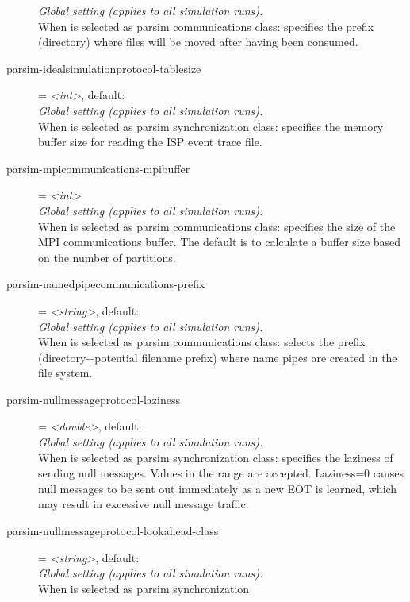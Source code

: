 \begin{description}
    \textit{Global setting (applies to all simulation runs).}\\
    When  is selected as parsim communications
    class: specifies the prefix (directory) where files will be moved after
    having been consumed.
\item[parsim-idealsimulationprotocol-tablesize] = \textit{<int>}, default: \\
    \textit{Global setting (applies to all simulation runs).}\\
    When  is selected as parsim
    synchronization class: specifies the memory buffer size for reading the ISP
    event trace file.
\item[parsim-mpicommunications-mpibuffer] = \textit{<int>}\\
    \textit{Global setting (applies to all simulation runs).}\\
    When  is selected as parsim communications class:
    specifies the size of the MPI communications buffer. The default is to
    calculate a buffer size based on the number of partitions.
\item[parsim-namedpipecommunications-prefix] = \textit{<string>}, default: \\
    \textit{Global setting (applies to all simulation runs).}\\
    When  is selected as parsim
    communications class: selects the prefix (directory+potential filename
    prefix) where name pipes are created in the file system.
\item[parsim-nullmessageprotocol-laziness] = \textit{<double>}, default: \\
    \textit{Global setting (applies to all simulation runs).}\\
    When  is selected as parsim synchronization
    class: specifies the laziness of sending null messages. Values in the range
    \ttt{[0,{\allowbreak}1)} are accepted. Laziness=0 causes null messages to
    be sent out immediately as a new EOT is learned, which may result in
    excessive null message traffic.
\item[parsim-nullmessageprotocol-lookahead-class] = \textit{<string>}, default: \\
    \textit{Global setting (applies to all simulation runs).}\\
    When  is selected as parsim synchronization

\end{description}
